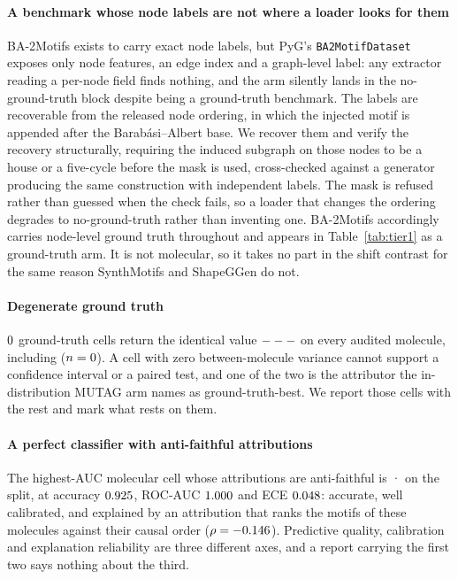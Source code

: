 \paragraph{A benchmark whose node labels are not where a loader looks for them}
BA-2Motifs exists to carry exact node labels, but PyG's
\texttt{BA2MotifDataset} exposes only node features, an edge index and a
graph-level label: any extractor reading a per-node field finds nothing, and
the arm silently lands in the no-ground-truth block despite being a
ground-truth benchmark. The labels are recoverable from the released node
ordering, in which the injected motif is appended after the
Barab\'asi--Albert base. We recover them and verify the recovery structurally,
requiring the induced subgraph on those nodes to be a house or a five-cycle
before the mask is used, cross-checked against a generator producing the same
construction with independent labels. The mask is refused rather than guessed
when the check fails, so a loader that changes the ordering degrades to
no-ground-truth rather than inventing one. BA-2Motifs accordingly carries
node-level ground truth throughout and appears in Table~\ref{tab:tier1} as a
ground-truth arm. It is not molecular, so it takes no part in the shift
contrast for the same reason SynthMotifs and ShapeGGen do not.

\ifHasDegenerateCells
\paragraph{Degenerate ground truth} $0{}$ ground-truth cells
return the identical value $---{}$ on every audited molecule, including
\degenCell{} ($n=0{}$). A cell with zero between-molecule variance
cannot support a confidence interval or a paired test, and one of the two is
the attributor the in-distribution MUTAG arm names as ground-truth-best. We
report those cells with the rest and mark what rests on them.
\fi

\ifHasStrongAnti
\paragraph{A perfect classifier with anti-faithful attributions} The
highest-AUC molecular cell whose attributions are anti-faithful is
\bestAucDataset{}·\bestAucBackbone{} on the \bestAucSplit{} split, at accuracy
$0.925{}$, ROC-AUC $1.000{}$ and ECE $0.048{}$: accurate,
well calibrated, and explained by an attribution that ranks the motifs of these
molecules against their causal order ($\rho=-0.146{}$). Predictive
quality, calibration and explanation reliability are three different axes, and
a report carrying the first two says nothing about the third.
\fi

